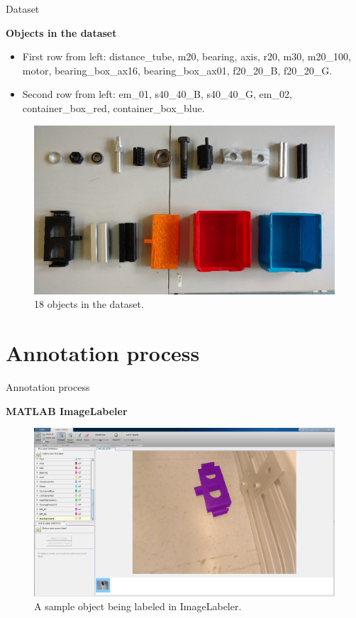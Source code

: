 \documentclass{beamer}
\begin{document}
\begin{frame}{Dataset}
	
	\textbf{Objects in the dataset}
	\begin{small}
		\begin{itemize}
			\item First row from left: distance\_tube, m20, bearing, axis, r20, m30, m20\_100, motor, bearing\_box\_ax16, bearing\_box\_ax01, f20\_20\_B, f20\_20\_G. 
			\item Second row from left: em\_01, s40\_40\_B, s40\_40\_G, em\_02, container\_box\_red, container\_box\_blue.
		\end{itemize}
	\end{small}
	\begin{figure}[h]
		\centering
		\includegraphics[scale=0.2]{images/all_objects}
		\captionsetup{justification=centering,margin=0.2cm}
		\caption{18 objects in the dataset.}
		\label{Fig:allobjects}
	\end{figure}

\end{frame}

\section{Annotation process}

\begin{frame}{Annotation process}
	
	\textbf{MATLAB ImageLabeler}
	\begin{figure}[!htb]
		\centering
		\includegraphics[width=.8\linewidth]{images/imglabler_eg}
		\captionsetup{justification=centering,margin=0.2cm}
		\caption{A sample object being labeled in ImageLabeler.}
		\label{Fig:annotate}
	\end{figure}

\end{frame}
\end{document}
